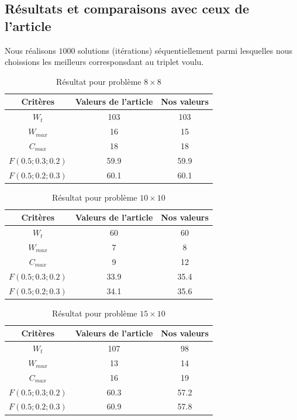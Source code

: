 \documentclass[10pt,a4paper]{scrartcl}
\begin{document}
\subsection{Résultats et comparaisons avec ceux de l'article}
Nous réalisons $1000$ solutions (itérations) séquentiellement parmi lesquelles nous choissions les meilleurs corresponsdant au triplet voulu.
\begin{table}[!h]
  \centering
  \begin{tabular}{|c|c|c|}
    \hline
    Critères & Valeurs de l'article & Nos valeurs \\
    \hline
    $W_t$ & 103 & 103 \\
    $W_{max}$ & 16 & 15 \\
    $C_{max}$ & 18 & 18 \\
    $F(0.5;0.3;0.2)$ & 59.9 & 59.9 \\
    $F(0.5;0.2;0.3)$ & 60.1 & 60.1 \\
    \hline
  \end{tabular}
  \caption{Résultat pour problème $8 \times 8$}
\end{table}

\begin{table}[!h]
  \centering
  \begin{tabular}{|c|c|c|}
    \hline
    Critères & Valeurs de l'article & Nos valeurs \\
    \hline
    $W_t$ & 60 & 60 \\
    $W_{max}$ & 7 & 8 \\
    $C_{max}$ & 9 & 12 \\
    $F(0.5;0.3;0.2)$ & 33.9 & 35.4 \\
    $F(0.5;0.2;0.3)$ & 34.1 & 35.6 \\
    \hline
  \end{tabular}
  \caption{Résultat pour problème $10 \times 10$}
\end{table}

\begin{table}[!h]
  \centering
  \begin{tabular}{|c|c|c|}
    \hline
    Critères & Valeurs de l'article & Nos valeurs \\
    \hline
    $W_t$ & 107 & 98 \\
    $W_{max}$ & 13 & 14 \\
    $C_{max}$ & 16 & 19 \\
    $F(0.5;0.3;0.2)$ & 60.3 & 57.2 \\
    $F(0.5;0.2;0.3)$ & 60.9 & 57.8 \\
    \hline
  \end{tabular}
  \caption{Résultat pour problème $15 \times 10$}
\end{table}
\end{document}
